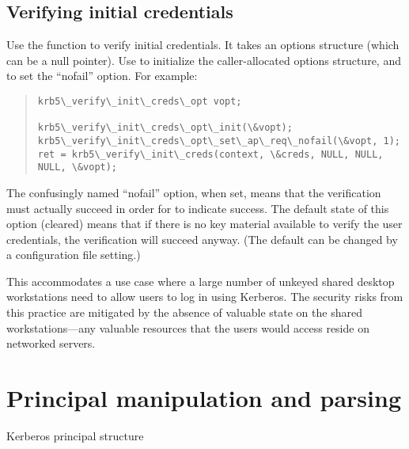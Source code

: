 \documentclass[letterpaper,10pt,english]{sphinxmanual}
\begin{document}
\section{Verifying initial credentials}
\label{appdev/init_creds:verifying-initial-credentials}
Use the function {\hyperref[appdev/refs/api/krb5_verify_init_creds:krb5_verify_init_creds]{}} to verify initial
credentials.  It takes an options structure (which can be a null
pointer).  Use {\hyperref[appdev/refs/api/krb5_verify_init_creds_opt_init:krb5_verify_init_creds_opt_init]{}} to initialize
the caller-allocated options structure, and
{\hyperref[appdev/refs/api/krb5_verify_init_creds_opt_set_ap_req_nofail:krb5_verify_init_creds_opt_set_ap_req_nofail]{}} to set the
``nofail'' option.  For example:
\begin{quote}

\begin{Verbatim}[commandchars=\\\{\}]
krb5\_verify\_init\_creds\_opt vopt;

krb5\_verify\_init\_creds\_opt\_init(\&vopt);
krb5\_verify\_init\_creds\_opt\_set\_ap\_req\_nofail(\&vopt, 1);
ret = krb5\_verify\_init\_creds(context, \&creds, NULL, NULL, NULL, \&vopt);
\end{Verbatim}
\end{quote}

The confusingly named ``nofail'' option, when set, means that the
verification must actually succeed in order for
{\hyperref[appdev/refs/api/krb5_verify_init_creds:krb5_verify_init_creds]{}} to indicate success.  The default
state of this option (cleared) means that if there is no key material
available to verify the user credentials, the verification will
succeed anyway.  (The default can be changed by a configuration file
setting.)

This accommodates a use case where a large number of unkeyed shared
desktop workstations need to allow users to log in using Kerberos.
The security risks from this practice are mitigated by the absence of
valuable state on the shared workstations---any valuable resources
that the users would access reside on networked servers.


\chapter{Principal manipulation and parsing}
\label{appdev/princ_handle:principal-manipulation-and-parsing}\label{appdev/princ_handle::doc}
Kerberos principal structure
\end{document}
